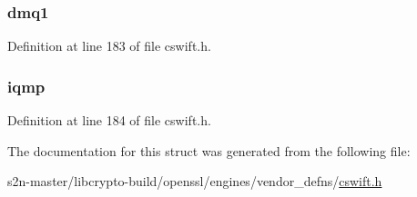 \subsubsection[{\texorpdfstring{dmq1}{dmq1}}]{ dmq1}\hypertarget{struct___s_w___c_r_t_a1bbdbbd43817ef0cdb7953d897128f34}{}\label{struct___s_w___c_r_t_a1bbdbbd43817ef0cdb7953d897128f34}


Definition at line 183 of file cswift.\+h.

\subsubsection[{\texorpdfstring{iqmp}{iqmp}}]{ iqmp}\hypertarget{struct___s_w___c_r_t_a8d9c9f6c7dab5d83b3bd3cbdf6caa1da}{}\label{struct___s_w___c_r_t_a8d9c9f6c7dab5d83b3bd3cbdf6caa1da}


Definition at line 184 of file cswift.\+h.



The documentation for this struct was generated from the following file\+:\begin{DoxyCompactItemize}
\item 
s2n-\/master/libcrypto-\/build/openssl/engines/vendor\+\_\+defns/\hyperlink{cswift_8h}{cswift.\+h}\end{DoxyCompactItemize}
